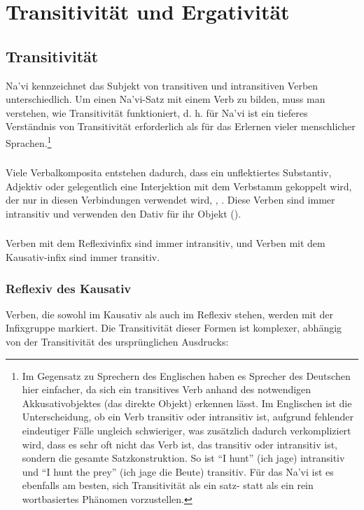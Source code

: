 
\section{Transitivität und Ergativität}

\subsection{Transitivität} Na'vi kennzeichnet das Subjekt von transitiven und intransitiven Verben unterschiedlich. Um einen Na'vi-Satz mit einem Verb zu bilden, muss man verstehen, wie Transitivität funktioniert, d. h. für Na'vi ist ein tieferes Verständnis von Transitivität erforderlich als für das Erlernen vieler menschlicher Sprachen.\footnote{Im Gegensatz zu Sprechern des Englischen haben es Sprecher des Deutschen hier einfacher, da sich ein transitives Verb anhand des notwendigen Akkusativobjektes (das direkte Objekt) erkennen lässt. Im Englischen ist die Unterscheidung, ob ein Verb transitiv oder intransitiv ist, aufgrund fehlender eindeutiger Fälle ungleich schwieriger, was zusätzlich dadurch verkompliziert wird, dass es sehr oft nicht das Verb ist, das transitiv oder intransitiv ist, sondern die gesamte Satzkonstruktion. So ist ``I hunt'' (ich jage) intransitiv und ``I hunt the prey'' (ich jage die Beute) transitiv. Für das Na'vi ist es ebenfalls am besten, sich Transitivität als ein satz- statt als ein rein wortbasiertes Phänomen vorzustellen.}

\subsubsection{} Viele Verbalkomposita entstehen dadurch, dass ein unflektiertes Substantiv, Adjektiv oder gelegentlich eine Interjektion mit dem Verbstamm   gekoppelt wird, der nur in diesen Verbindungen verwendet wird,  ,  . Diese Verben sind immer intransitiv und verwenden den Dativ für ihr Objekt
().

\subsubsection{} Verben mit dem Reflexivinfix  sind immer intransitiv, und  Verben mit dem Kausativ-infix  sind immer transitiv.

\subsubsection{Reflexiv des Kausativ}
\label{reflexive-of-causative} 
Verben, die sowohl im Kausativ als auch im Reflexiv stehen, werden mit der Infixgruppe  markiert. Die Transitivität dieser Formen ist komplexer, abhängig von der Transitivität des ursprünglichen Ausdrucks:


